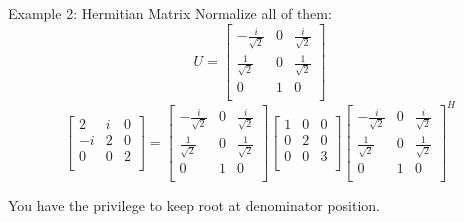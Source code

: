 \documentclass{beamer}
\begin{document}
\begin{frame}{Example 2: Hermitian Matrix}
Normalize all of them:
\begin{equation*}
    U=\left[ \begin{matrix}
        -\frac{i}{\sqrt{2}}&		0&		\frac{i}{\sqrt{2}}\\
        \frac{1}{\sqrt{2}}&		0&		\frac{1}{\sqrt{2}}\\
        0&		1&		0\\
    \end{matrix} \right]
\end{equation*}
\begin{equation*}
    \left[ \begin{matrix}
        2&		i&		0\\
        -i&		2&		0\\
        0&		0&		2\\
    \end{matrix} \right] =\left[ \begin{matrix}
        -\frac{i}{\sqrt{2}}&		0&		\frac{i}{\sqrt{2}}\\
        \frac{1}{\sqrt{2}}&		0&		\frac{1}{\sqrt{2}}\\
        0&		1&		0\\
    \end{matrix} \right] \left[ \begin{matrix}
        1&		0&		0\\
        0&		2&		0\\
        0&		0&		3\\
    \end{matrix} \right] \left[ \begin{matrix}
        -\frac{i}{\sqrt{2}}&		0&		\frac{i}{\sqrt{2}}\\
        \frac{1}{\sqrt{2}}&		0&		\frac{1}{\sqrt{2}}\\
        0&		1&		0\\
    \end{matrix} \right] ^H
\end{equation*}

You have the privilege to keep root at denominator position.


\end{frame}
\end{document}
